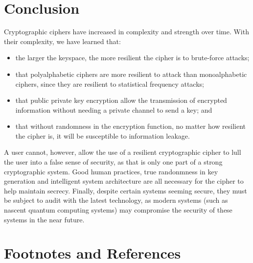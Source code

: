 \documentclass{AIAA}
\begin{document}
\section{Conclusion}
Cryptographic ciphers have increased in complexity and strength over time. With their complexity, we have learned that:
\begin{itemize}
\item the larger the keyspace, the more resilient the cipher is to brute-force attacks;
\item that polyalphabetic ciphers are more resilient to attack than monoalphabetic ciphers, since they are resilient to statistical frequency attacks;
\item that public private key encryption allow the transmission of encrypted information without needing a private channel to send a key; and
\item that without randomness in the encryption function, no matter how resilient the cipher is, it will be susceptible to information leakage.
\end{itemize}

A user cannot, however, allow the use of a resilient cryptographic cipher to lull the user into a false sense of security, as that is only one part of a strong cryptographic system. Good human practices, true randonmness in key generation and intelligent system architecture are all necessary for the cipher to help maintain secrecy. Finally, despite certain systems seeming secure, they must be subject to audit with the latest technology, as modern systems (such as nascent quantum computing systems) may compromise the security of these systems in the near future.

\section*{Footnotes and References}
\end{document}
